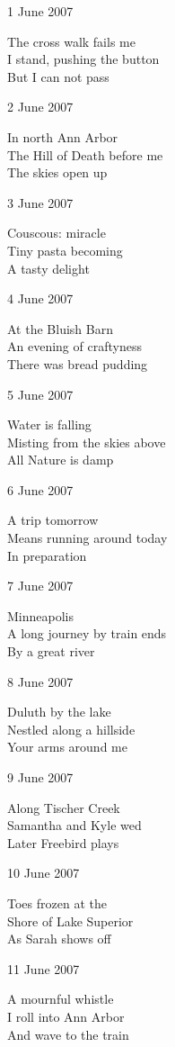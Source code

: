 \documentclass[12pt]{article}
\begin{document}
1 June 2007

The cross walk fails me \\
I stand, pushing the button \\
But I can not pass

2 June 2007

In north Ann Arbor \\
The Hill of Death before me \\
The skies open up

3 June 2007

Couscous: miracle \\
Tiny pasta becoming \\
A tasty delight

4 June 2007

At the Bluish Barn \\
An evening of craftyness \\
There was bread pudding


\newpage

5 June 2007

Water is falling \\
Misting from the skies above \\
All Nature is damp

6 June 2007

A trip tomorrow \\
Means running around today \\
In preparation

7 June 2007

Minneapolis \\
A long journey by train ends \\
By a great river

8 June 2007

Duluth by the lake \\
Nestled along a hillside \\
Your arms around me

9 June 2007

Along Tischer Creek \\
Samantha and Kyle wed \\
Later Freebird plays

10 June 2007

Toes frozen at the \\
Shore of Lake Superior \\
As Sarah shows off

11 June 2007

A mournful whistle \\
I roll into Ann Arbor \\
And wave to the train
\end{document}
